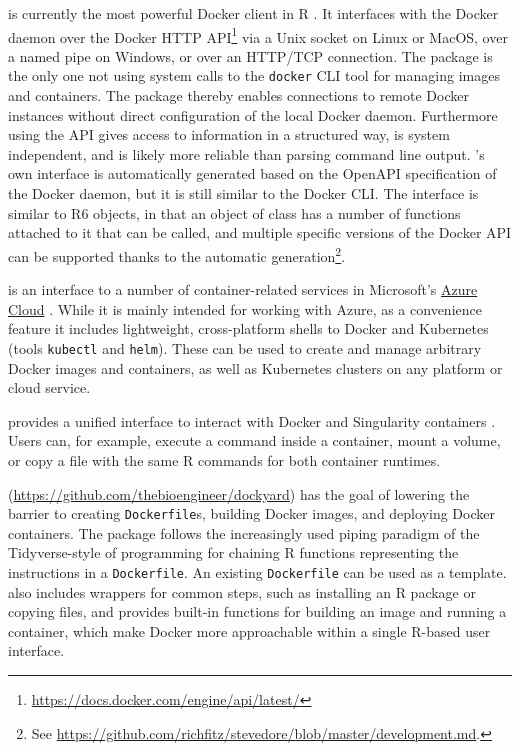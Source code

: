\textbf{} is currently the most powerful Docker
client in R \citep{cran_stevedore}. It interfaces with the Docker daemon
over the Docker HTTP
API\footnote{\href{https://docs.docker.com/engine/api/latest/}{https://docs.docker.com/engine/api/latest/}}
via a Unix socket on Linux or MacOS, over a named pipe on Windows, or
over an HTTP/TCP connection. The package is the only one not using
system calls to the \texttt{docker} CLI tool for managing images and
containers. The package thereby enables connections to remote Docker
instances without direct configuration of the local Docker daemon.
Furthermore using the API gives access to information in a structured
way, is system independent, and is likely more reliable than parsing
command line output. 's own interface is automatically
generated based on the OpenAPI specification of the Docker daemon, but
it is still similar to the Docker CLI. The interface is similar to R6
objects, in that an object of class  has a
number of functions attached to it that can be called, and multiple
specific versions of the Docker API can be supported thanks to the
automatic
generation\footnote{See \href{https://github.com/richfitz/stevedore/blob/master/development.md}{https://github.com/richfitz/stevedore/blob/master/development.md}.}.

\textbf{} is an interface to a number of
container-related services in Microsoft's
\href{https://azure.microsoft.com/}{Azure Cloud}
\citep{AzureContainers_2019}. While it is mainly intended for working
with Azure, as a convenience feature it includes lightweight,
cross-platform shells to Docker and Kubernetes (tools \texttt{kubectl}
and \texttt{helm}). These can be used to create and manage arbitrary
Docker images and containers, as well as Kubernetes clusters on any
platform or cloud service.

\textbf{} provides a unified interface to interact
with Docker and Singularity containers \citep{cannoodt_babelwhale_2019}.
Users can, for example, execute a command inside a container, mount a
volume, or copy a file with the same R commands for both container
runtimes.

\textbf{}
(\url{https://github.com/thebioengineer/dockyard}) has the goal of
lowering the barrier to creating \texttt{Dockerfile}s, building Docker
images, and deploying Docker containers. The package follows the
increasingly used piping paradigm of the Tidyverse-style
\citep{wickham_welcome_2019} of programming for chaining R functions
representing the instructions in a \texttt{Dockerfile}. An existing
\texttt{Dockerfile} can be used as a template.  also
includes wrappers for common steps, such as installing an R package or
copying files, and provides built-in functions for building an image and
running a container, which make Docker more approachable within a single
R-based user interface.


